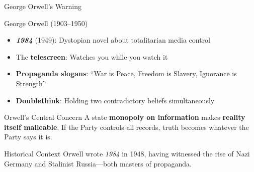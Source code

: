 \documentclass[aspectratio=169]{beamer}
\begin{document}
\begin{frame}{George Orwell's Warning}
\begin{block}{George Orwell (1903--1950)}
\begin{itemize}
  \item \textbf{\textit{1984}} (1949): Dystopian novel about totalitarian media control
  \item The \textbf{telescreen}: Watches you while you watch it
  \item \textbf{Propaganda slogans}: ``War is Peace, Freedom is Slavery, Ignorance is Strength''
  \item \textbf{Doublethink}: Holding two contradictory beliefs simultaneously
\end{itemize}
\end{block}

\vspace{0.3em}
\begin{alertblock}{Orwell's Central Concern}
A state \textbf{monopoly on information} makes \textbf{reality itself malleable}. If the Party controls all records, truth becomes whatever the Party says it is.
\end{alertblock}

\vspace{0.3em}
\begin{exampleblock}{Historical Context}
Orwell wrote \textit{1984} in 1948, having witnessed the rise of Nazi Germany and Stalinist Russia---both masters of propaganda.
\end{exampleblock}
\end{frame}
\end{document}
